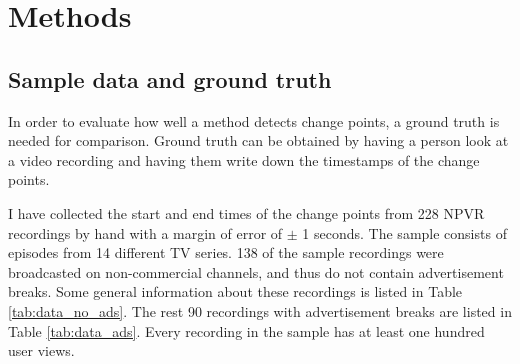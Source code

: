 



\section{Methods} \label{sec:casestudy}

\subsection{Sample data and ground truth} \label{subsec:groundtruth}

In order to evaluate how well a method detects change points, a ground truth is needed for comparison. Ground truth can be obtained by having a person look at a video recording and having them write down the timestamps of the change points.

I have collected the start and end times of the change points from 228 NPVR recordings by hand with a margin of error of $\pm$ 1 seconds. The sample consists of episodes from 14 different TV series. 138 of the sample recordings were broadcasted on non-commercial channels, and thus do not contain advertisement breaks. Some general information about these recordings is listed in Table \ref{tab:data_no_ads}. The rest 90 recordings with advertisement breaks are listed in Table \ref{tab:data_ads}. Every recording in the sample has at least one hundred user views.

